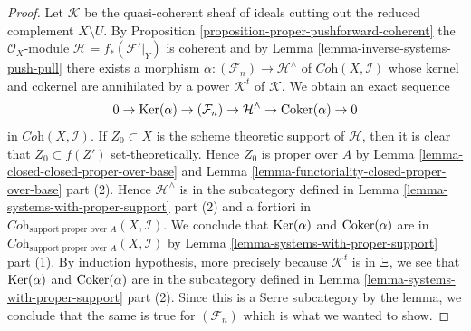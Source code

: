 \begin{proof}
\medskip\noindent
Let $\mathcal{K}$ be the quasi-coherent sheaf of ideals cutting
out the reduced complement $X \setminus U$. By
Proposition \ref{proposition-proper-pushforward-coherent}
the $\mathcal{O}_X$-module $\mathcal{H} = f_*(\mathcal{F}'|_Y)$ is coherent
and by Lemma \ref{lemma-inverse-systems-push-pull}
there exists a morphism $\alpha : (\mathcal{F}_n) \to \mathcal{H}^\wedge$
of $\textit{Coh}(X, \mathcal{I})$ whose kernel and cokernel are
annihilated by a power $\mathcal{K}^t$ of $\mathcal{K}$.
We obtain an exact sequence
$$
0 \to \mathop{\mathrm{Ker}}(\alpha) \to (\mathcal{F}_n) \to
\mathcal{H}^\wedge \to \mathop{\mathrm{Coker}}(\alpha) \to 0
$$
in $\textit{Coh}(X, \mathcal{I})$. If $Z_0 \subset X$ is the scheme theoretic
support of $\mathcal{H}$, then it is clear that $Z_0 \subset f(Z')$
set-theoretically. Hence $Z_0$ is proper over $A$ by
Lemma \ref{lemma-closed-closed-proper-over-base} and
Lemma \ref{lemma-functoriality-closed-proper-over-base} part (2).
Hence $\mathcal{H}^\wedge$ is in the subcategory defined in
Lemma \ref{lemma-systems-with-proper-support} part (2)
and a fortiori in
$\textit{Coh}_{\text{support proper over }A}(X, \mathcal{I})$.
We conclude that $\mathop{\mathrm{Ker}}(\alpha)$ and $\mathop{\mathrm{Coker}}(\alpha)$
are in $\textit{Coh}_{\text{support proper over }A}(X, \mathcal{I})$
by Lemma \ref{lemma-systems-with-proper-support} part (1).
By induction hypothesis, more precisely because $\mathcal{K}^t$ is in $\Xi$,
we see that $\mathop{\mathrm{Ker}}(\alpha)$ and $\mathop{\mathrm{Coker}}(\alpha)$ are in
the subcategory defined in
Lemma \ref{lemma-systems-with-proper-support} part (2).
Since this is a Serre subcategory by the lemma, we conclude that the
same is true for $(\mathcal{F}_n)$ which is what we wanted to show.
\end{proof}

